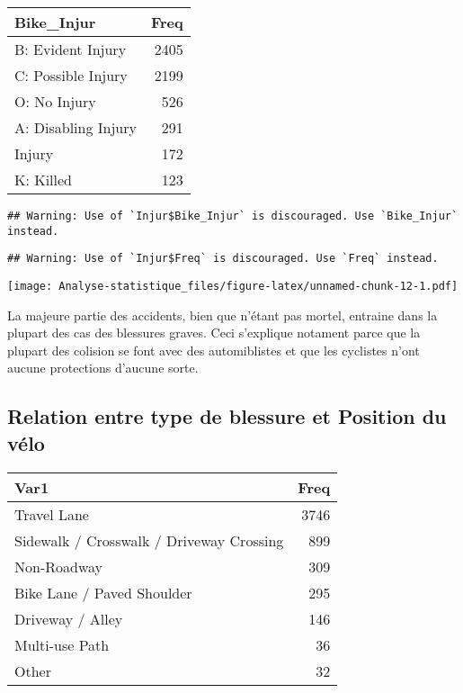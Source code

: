 \documentclass[
  french,
]{article}
\begin{document}
\begin{table}
\centering
\begin{tabular}{l|r}
\hline
Bike\_Injur & Freq\\
\hline
B: Evident Injury & 2405\\
\hline
C: Possible Injury & 2199\\
\hline
O: No Injury & 526\\
\hline
A: Disabling Injury & 291\\
\hline
Injury & 172\\
\hline
K: Killed & 123\\
\hline
\end{tabular}
\end{table}

\begin{verbatim}
## Warning: Use of `Injur$Bike_Injur` is discouraged. Use `Bike_Injur` instead.
\end{verbatim}

\begin{verbatim}
## Warning: Use of `Injur$Freq` is discouraged. Use `Freq` instead.
\end{verbatim}

\texttt{[image: Analyse-statistique\_files/figure-latex/unnamed-chunk-12-1.pdf]}

La majeure partie des accidents, bien que n'étant pas mortel, entraine
dans la plupart des cas des blessures graves. Ceci s'explique notament
parce que la plupart des colision se font avec des automiblistes et que
les cyclistes n'ont aucune protections d'aucune sorte.

\hypertarget{relation-entre-type-de-blessure-et-position-du-vuxe9lo}{%
\subsection{Relation entre type de blessure et Position du
vélo}\label{relation-entre-type-de-blessure-et-position-du-vuxe9lo}}

\begin{table}
\centering
\begin{tabular}{l|r}
\hline
Var1 & Freq\\
\hline
Travel Lane & 3746\\
\hline
Sidewalk / Crosswalk / Driveway Crossing & 899\\
\hline
Non-Roadway & 309\\
\hline
Bike Lane / Paved Shoulder & 295\\
\hline
Driveway / Alley & 146\\
\hline
Multi-use Path & 36\\
\hline
Other & 32\\
\hline
\end{tabular}
\end{table}
\end{document}
